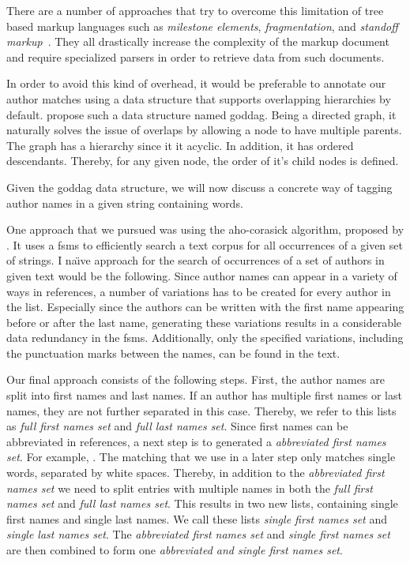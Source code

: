 There are a number of approaches that try to overcome this limitation of tree based markup languages such as \textit{milestone elements}, \textit{fragmentation}, and \textit{standoff markup}~\citep{sperberg2000goddag}. They all drastically increase the complexity of the markup document and require specialized parsers in order to retrieve data from such documents.

In order to avoid this kind of overhead, it would be preferable to annotate our author matches using a data structure that supports overlapping hierarchies by default.
\citet{sperberg2000goddag} propose such a data structure named \acrfull{goddag}.
Being a directed graph, it naturally solves the issue of overlaps by allowing a node to have multiple parents.
The graph has a hierarchy since it it acyclic.
In addition, it has ordered descendants.
Thereby, for any given node, the order of it's child nodes is defined.

\bigskip

Given the \gls{goddag} data structure, we will now discuss a concrete way of tagging author names in a given string containing words.

One approach that we pursued was using the \gls{aho-corasick algorithm}, proposed by \citet{aho1975efficient}.
It uses a \glspl{fsm} to efficiently search a text corpus for all occurrences of a given set of strings.
I na{\"{\i}}ve approach for the search of occurrences of a set of authors in given text would be the following.
Since author names can appear in a variety of ways in references, a number of variations has to be created for every author in the list.
Especially since the authors can be written with the first name appearing before or after the last name, generating these variations results in a considerable data redundancy in the \glspl{fsm}.
Additionally, only the specified variations, including the punctuation marks between the names, can be found in the text.

Our final approach consists of the following steps.
First, the author names are split into first names and last names.
If an author has multiple first names or last names, they are not further separated in this case.
Thereby, we refer to this lists as \textit{full first names set} and \textit{full last names set}.
Since first names can be abbreviated in references, a next step is to generated a \textit{abbreviated first names set}.
For example, .
The matching that we use in a later step only matches single words, separated by white spaces.
Thereby, in addition to the \textit{abbreviated first names set} we need to split entries with multiple names in both the \textit{full first names set} and \textit{full last names set}.
This results in two new lists, containing single first names and single last names.
We call these lists \textit{single first names set} and \textit{single last names set}.
The \textit{abbreviated first names set} and \textit{single first names set} are then combined to form one \textit{abbreviated and single first names set}.

